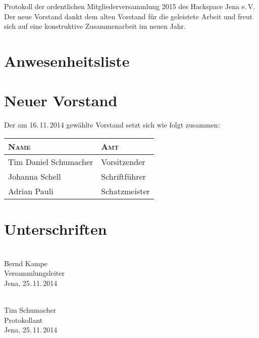 \documentclass[ngerman]{scrartcl}
\begin{document}
\begin{Protokoll}{Protokoll der ordentlichen Mitgliederversammlung 2015 des Hackspace Jena e.\,V.}
Der neue Vorstand dankt dem alten Vorstand für die geleistete Arbeit und freut
sich auf eine konstruktive Zusammenarbeit im neuen Jahr.

\newpage
\appendix

\section{Anwesenheitsliste}
\newpage
\section{Neuer Vorstand}

Der am 16.\,11.\,2014 gewählte Vorstand setzt sich wie folgt zusammen:

\label{sec:neuer_vorstand}
\begin{table}[h!]
    \centering
    \begin{tabularx}{\textwidth}{l|l}
        \textsc{Name} & \textsc{Amt} \\ \hline
        Tim Daniel Schumacher & Vorsitzender \\
        Johanna Schell &  Schriftführer \\
        Adrian Pauli & Schatzmeister
    \end{tabularx}
\end{table}

\newpage
\section{Unterschriften}
\vspace{2cm}
\begin{multicols}{2}
  \noindent \makebox[5cm]{\hrulefill} \\
  Bernd Kampe \\
  Versammlungsleiter \\
  Jena, 25.\,11.\,2014

  \noindent \makebox[5cm]{\hrulefill} \\
  Tim Schumacher \\
  Protokollant \\
  Jena, 25.\,11.\,2014
\end{multicols}

\end{Protokoll}
\end{document}
